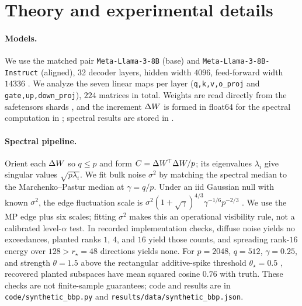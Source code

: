 \section{Theory and experimental details}
\label{app:details}

\paragraph{Models.}
We use the matched pair \texttt{Meta-Llama-3-8B} (base) and
\texttt{Meta-Llama-3-8B-Instruct} (aligned), 32 decoder layers, hidden width
$4096$, feed-forward width $14336$ \citep{grattafiori2024llama3}. We analyze the seven linear maps per layer
(\texttt{q,k,v,o\_proj} and \texttt{gate,up,down\_proj}), $224$ matrices in
total. Weights are read directly from the safetensors shards \citep{safetensors},
and the increment $\Delta W$ is formed in float64 for the spectral computation in
; spectral results are stored in
.

\paragraph{Spectral pipeline.}
Orient each $\Delta W$ so $q\le p$ and form $C=\Delta W^{\!\top}\Delta W/p$; its eigenvalues
$\lambda_i$ give singular values $\sqrt{p\lambda_i}$. We fit bulk noise $\sigma^2$
by matching the spectral median to the Marchenko--Pastur median at $\gamma=q/p$.
Under an iid Gaussian null with known $\sigma^2$, the edge fluctuation scale is
$\sigma^2(1+\sqrt\gamma)^{4/3}\gamma^{-1/6}p^{-2/3}$ \citep{johnstone2001}.
We use the MP edge plus six scales; fitting $\sigma^2$ makes this an operational
visibility rule, not a calibrated level-$\alpha$ test. In recorded implementation
checks, diffuse noise yields no exceedances, planted ranks $1$, $4$, and $16$ yield
those counts, and spreading rank-$16$ energy over $128>r_\star=48$ directions yields none.
For $p=2048$, $q=512$, $\gamma=0.25$, and strength $\theta=1.5$ above the
rectangular additive-spike threshold $\theta_\star=0.5$ \citep{benaych2012},
recovered planted subspaces have mean squared
cosine $0.76$ with truth. These checks are not finite-sample guarantees; code and
results are in \texttt{code/synthetic\_bbp.py} and
\texttt{results/data/synthetic\_bbp.json}.


